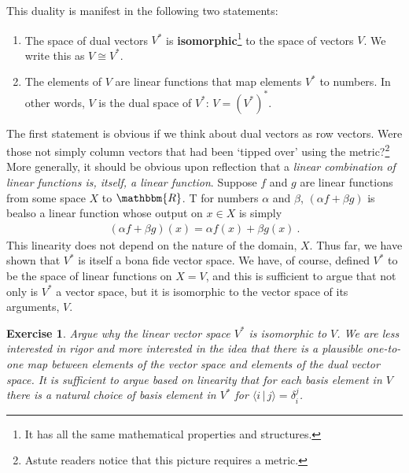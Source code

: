 \documentclass[
  11pt,
	colorful,
	raggedright,
]{tufte-style-thesis-flip}
\newtheorem{exercise}{Exercise}[section]
\begin{document}
This duality is manifest in the following two statements:
\begin{enumerate}
  \item The space of dual vectors $V^*$ is \textbf{isomorphic}\footnote{It has all the same mathematical properties and structures.} to the space of vectors $V$. We write this as $V \cong V^*$.

  \item The elements of $V$ are linear functions that map elements $V^*$ to numbers. In other words, $V$ is the dual space of $V^*$: $V=(V^*)^*$.
\end{enumerate}
The first statement is obvious if we think about dual vectors as row vectors. Were those not simply column vectors that had been `tipped over' using the metric?\footnote{Astute readers notice that this picture requires a metric.} More generally, it should be obvious upon reflection that a \emph{linear combination of linear functions is, itself, a linear function}. Suppose $f$ and $g$ are linear functions from some space $X$ to $\mathbbm{R}$. T for numbers $\alpha$ and $\beta$, $(\alpha f+\beta g)$ is  bealso a linear function whose output on $x\in X$ is simply
\begin{align}
  (\alpha f + \beta g)(x) = \alpha f(x) + \beta g(x) \ .
\end{align}
This linearity does not depend on the nature of the domain, $X$. Thus far, we have shown that $V^*$ is itself a bona fide vector space. We have, of course, defined $V^*$ to be the space of linear functions on $X=V$, and this is sufficient to argue that not only is $V^*$ a vector space, but it is isomorphic to the vector space of its arguments, $V$.
\begin{exercise}
Argue why the linear vector space $V^*$ is isomorphic to $V$. We are less interested in rigor and more interested in the idea that there is a plausible one-to-one map between elements of the vector space and elements of the dual vector space. It is sufficient to argue based on linearity that for each basis element in $V$ there is a natural choice of basis element in $V^*$ for $\langle i \,|\, j\rangle = \delta_i^j$. 
\end{exercise}
\end{document}
